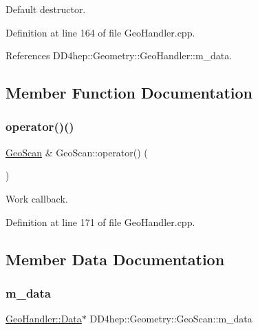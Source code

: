 Default destructor. 



Definition at line 164 of file Geo\+Handler.\+cpp.



References D\+D4hep\+::\+Geometry\+::\+Geo\+Handler\+::m\+\_\+data.



\subsection{Member Function Documentation}
\hypertarget{class_d_d4hep_1_1_geometry_1_1_geo_scan_aa6914b5e822dcf712d110644b4c202f1}{}\label{class_d_d4hep_1_1_geometry_1_1_geo_scan_aa6914b5e822dcf712d110644b4c202f1} 
\subsubsection{\texorpdfstring{operator()()}{operator()()}}
{\footnotesize\ttfamily \hyperlink{class_d_d4hep_1_1_geometry_1_1_geo_scan}{Geo\+Scan} \& Geo\+Scan\+::operator() (\begin{DoxyParamCaption}{ }\end{DoxyParamCaption})\hspace{0.3cm}{\ttfamily [virtual]}}



Work callback. 



Definition at line 171 of file Geo\+Handler.\+cpp.



\subsection{Member Data Documentation}
\hypertarget{class_d_d4hep_1_1_geometry_1_1_geo_scan_a03dadf49cd85c4b8702872ee8df66fc1}{}\label{class_d_d4hep_1_1_geometry_1_1_geo_scan_a03dadf49cd85c4b8702872ee8df66fc1} 
\subsubsection{\texorpdfstring{m\+\_\+data}{m\_data}}
{\footnotesize\ttfamily \hyperlink{class_d_d4hep_1_1_geometry_1_1_geo_handler_types_a568935b7e878d3ea9fe97a2ecf33d641}{Geo\+Handler\+::\+Data}$\ast$ D\+D4hep\+::\+Geometry\+::\+Geo\+Scan\+::m\+\_\+data\hspace{0.3cm}{\ttfamily [protected]}}



